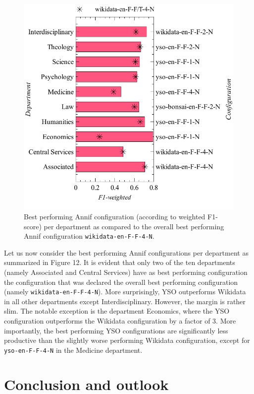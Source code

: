 \begin{figure}
\centering
\includegraphics{images/metrics_dept_summary.pdf}
\caption{Best performing Annif configuration (according to weighted
F1-score) per department as compared to the overall best performing
Annif configuration \texttt{wikidata-en-F-F-4-N}.}
\end{figure}

Let us now consider the best performing Annif configurations per
department as summarized in Figure 12. It is evident that only two of
the ten departments (namely Associated and Central Services) have as
best performing configuration the configuration that was declared the
overall best performing configuration (namely
\texttt{wikidata-en-F-F-4-N}). More surprisingly, YSO outperforms
Wikidata in all other departments except Interdisciplinary. However, the
margin is rather slim. The notable exception is the department
Economics, where the YSO configuration outperforms the Wikidata
configuration by a factor of 3. More importantly, the best performing
YSO configurations are significantly less productive than the slightly
worse performing Wikidata configuration, except for
\texttt{yso-en-F-F-4-N} in the Medicine department.

\hypertarget{conclusion-and-outlook}{%
\section{Conclusion and outlook}\label{conclusion-and-outlook}}

